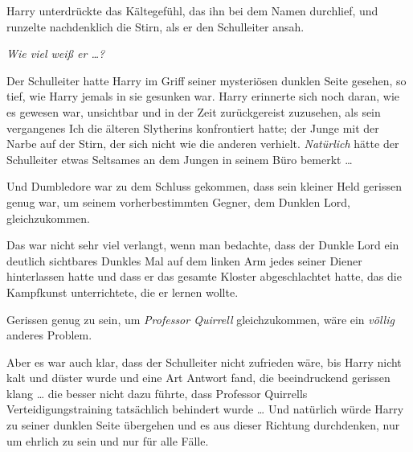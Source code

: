 Harry unterdrückte das Kältegefühl, das ihn bei dem Namen durchlief, und runzelte nachdenklich die Stirn, als er den Schulleiter ansah.

\emph{Wie viel weiß er …?}

Der Schulleiter hatte Harry im Griff seiner mysteriösen dunklen Seite gesehen, so tief, wie Harry jemals in sie gesunken war. Harry erinnerte sich noch daran, wie es gewesen war, unsichtbar und in der Zeit zurückgereist zuzusehen, als sein vergangenes Ich die älteren Slytherins konfrontiert hatte; der Junge mit der Narbe auf der Stirn, der sich nicht wie die anderen verhielt. \emph{Natürlich} hätte der Schulleiter etwas Seltsames an dem Jungen in seinem Büro bemerkt …

Und Dumbledore war zu dem Schluss gekommen, dass sein kleiner Held gerissen genug war, um seinem vorherbestimmten Gegner, dem Dunklen Lord, gleichzukommen.

Das war nicht sehr viel verlangt, wenn man bedachte, dass der Dunkle Lord ein deutlich sichtbares Dunkles Mal auf dem linken Arm jedes seiner Diener hinterlassen hatte und dass er das gesamte Kloster abgeschlachtet hatte, das die Kampfkunst unterrichtete, die er lernen wollte.

Gerissen genug zu sein, um \emph{Professor Quirrell} gleichzukommen, wäre ein \emph{völlig} anderes Problem.

Aber es war auch klar, dass der Schulleiter nicht zufrieden wäre, bis Harry nicht kalt und düster wurde und eine Art Antwort fand, die beeindruckend gerissen klang … die besser nicht dazu führte, dass Professor Quirrells Verteidigungstraining tatsächlich behindert wurde …
Und natürlich würde Harry zu seiner dunklen Seite übergehen und es aus dieser Richtung durchdenken, nur um ehrlich zu sein und nur für alle Fälle.

